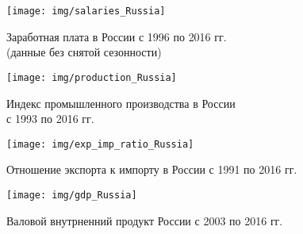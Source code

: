 \documentclass[_DKB_p1_Money.tex]{subfiles}
\begin{document}
\begin{frame}[shrink=15]
\begin{figure}
\center
\texttt{[image: img/salaries\_Russia]}
\caption{Заработная плата в России с 1996 по 2016 гг.\\ (данные без снятой сезонности)}
\end{figure}
\end{frame}

\begin{frame}[shrink=15]
\begin{figure}
\center
\texttt{[image: img/production\_Russia]}
\caption{Индекс промышленного производства в России\\ с 1993 по 2016 гг.}
\end{figure}
\end{frame}

\begin{frame}[shrink=15]
\begin{figure}
\center
\texttt{[image: img/exp\_imp\_ratio\_Russia]}
\caption{Отношение экспорта к импорту в России с 1991 по 2016 гг.}
\end{figure}
\end{frame}

\begin{frame}[shrink=15]
\begin{figure}
\center
\texttt{[image: img/gdp\_Russia]}
\caption{Валовой внутрненний продукт России с 2003 по 2016 гг.}
\end{figure}
\end{frame}
\end{document}
